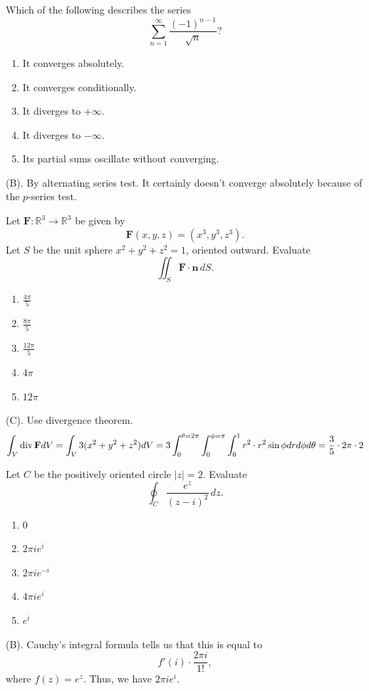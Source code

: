 \begin{exercise}
Which of the following describes the series
\[
\sum_{n=1}^{\infty}\frac{(-1)^{n-1}}{\sqrt n}?
\]
\begin{enumerate}[label=(\Alph*)]
\item It converges absolutely.
\item It converges conditionally.
\item It diverges to $+\infty$.
\item It diverges to $-\infty$.
\item Its partial sums oscillate without converging.
\end{enumerate}
\end{exercise}
\begin{solution}
(B). By alternating series test. It certainly doesn't 
converge absolutely because of the $p$-series test.
\end{solution}

\begin{exercise}
Let $\mathbf F:\mathbb R^3\to\mathbb R^3$
be given by
\[
\mathbf F(x,y,z)=(x^3,y^3,z^3).
\]
Let $S$ be the unit sphere
$x^2+y^2+z^2=1$, oriented outward.
Evaluate
\[
\iint_S\mathbf F\cdot\mathbf n\,dS.
\]
\begin{enumerate}[label=(\Alph*)]
\item $\frac{4\pi}{5}$
\item $\frac{8\pi}{5}$
\item $\frac{12\pi}{5}$
\item $4\pi$
\item $12\pi$
\end{enumerate}
\end{exercise}
\begin{solution}
(C). Use divergence theorem.
\[
\int_V \operatorname{div} \mathbf{F} dV 
= \int_V 3(x^2 + y^2 + z^2) dV
=3\int_{0}^{\theta = 2\pi} \int_{0}^{\phi = \pi} \int_0^1 r^2 \cdot r^2 \sin \phi dr d\phi d\theta
=\frac{3}{5} \cdot 2\pi \cdot 2
\]
\end{solution}

\begin{exercise}
Let $C$ be the positively oriented circle
$|z|=2$. Evaluate
\[
\oint_C\frac{e^z}{(z-i)^2}\,dz.
\]
\begin{enumerate}[label=(\Alph*)]
\item $0$
\item $2\pi i e^i$
\item $2\pi i e^{-i}$
\item $4\pi i e^i$
\item $e^i$
\end{enumerate}
\end{exercise}
\begin{solution}
(B). Cauchy's integral formula tells us that this is equal to 
\[
f'(i) \cdot \frac{2\pi i }{1!}, 
\]
where $f(z) = e^z$. Thus, we have $2\pi i e^i$.
\end{solution}

